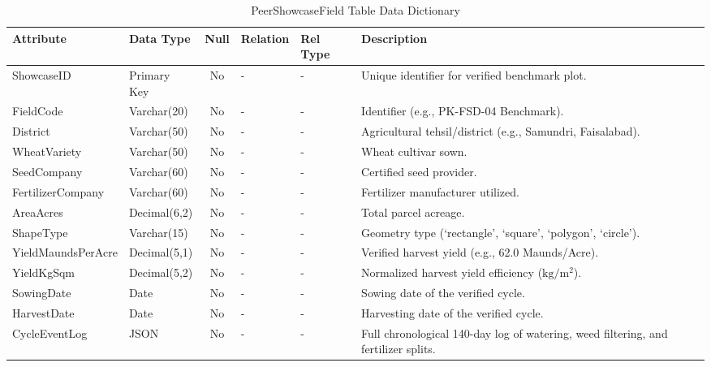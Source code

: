 \begin{table}[H]
\footnotesize
\centering
\caption{PeerShowcaseField Table Data Dictionary}
\label{tab:showcase_table}
\begin{tabular}{|l|l|c|l|l|p{4.5cm}|}
\hline
\textbf{Attribute} & \textbf{Data Type} & \textbf{Null} & \textbf{Relation} & \textbf{Rel Type} & \textbf{Description} \\ \hline
ShowcaseID & Primary Key & No & - & - & Unique identifier for verified benchmark plot. \\ \hline
FieldCode & Varchar(20) & No & - & - & Identifier (e.g., PK-FSD-04 Benchmark). \\ \hline
District & Varchar(50) & No & - & - & Agricultural tehsil/district (e.g., Samundri, Faisalabad). \\ \hline
WheatVariety & Varchar(50) & No & - & - & Wheat cultivar sown. \\ \hline
SeedCompany & Varchar(60) & No & - & - & Certified seed provider. \\ \hline
FertilizerCompany & Varchar(60) & No & - & - & Fertilizer manufacturer utilized. \\ \hline
AreaAcres & Decimal(6,2) & No & - & - & Total parcel acreage. \\ \hline
ShapeType & Varchar(15) & No & - & - & Geometry type (`rectangle', `square', `polygon', `circle'). \\ \hline
YieldMaundsPerAcre & Decimal(5,1) & No & - & - & Verified harvest yield (e.g., 62.0 Maunds/Acre). \\ \hline
YieldKgSqm & Decimal(5,2) & No & - & - & Normalized harvest yield efficiency ($\text{kg}/\text{m}^2$). \\ \hline
SowingDate & Date & No & - & - & Sowing date of the verified cycle. \\ \hline
HarvestDate & Date & No & - & - & Harvesting date of the verified cycle. \\ \hline
CycleEventLog & JSON & No & - & - & Full chronological 140-day log of watering, weed filtering, and fertilizer splits. \\ \hline
\end{tabular}
\end{table}

